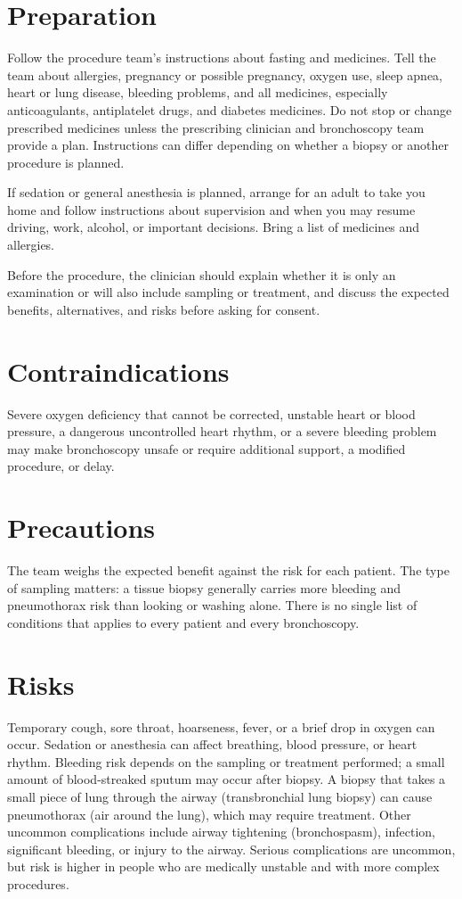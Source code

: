 \section*{Preparation}
Follow the procedure team's instructions about fasting and medicines. Tell the team about allergies, pregnancy or possible pregnancy, oxygen use, sleep apnea, heart or lung disease, bleeding problems, and all medicines, especially anticoagulants, antiplatelet drugs, and diabetes medicines. Do not stop or change prescribed medicines unless the prescribing clinician and bronchoscopy team provide a plan. Instructions can differ depending on whether a biopsy or another procedure is planned.

If sedation or general anesthesia is planned, arrange for an adult to take you home and follow instructions about supervision and when you may resume driving, work, alcohol, or important decisions. Bring a list of medicines and allergies.

Before the procedure, the clinician should explain whether it is only an examination or will also include sampling or treatment, and discuss the expected benefits, alternatives, and risks before asking for consent.

\section*{Contraindications}
Severe oxygen deficiency that cannot be corrected, unstable heart or blood pressure, a dangerous uncontrolled heart rhythm, or a severe bleeding problem may make bronchoscopy unsafe or require additional support, a modified procedure, or delay.

\section*{Precautions}
The team weighs the expected benefit against the risk for each patient. The type of sampling matters: a tissue biopsy generally carries more bleeding and pneumothorax risk than looking or washing alone. There is no single list of conditions that applies to every patient and every bronchoscopy.

\section*{Risks}
Temporary cough, sore throat, hoarseness, fever, or a brief drop in oxygen can occur. Sedation or anesthesia can affect breathing, blood pressure, or heart rhythm. Bleeding risk depends on the sampling or treatment performed; a small amount of blood-streaked sputum may occur after biopsy. A biopsy that takes a small piece of lung through the airway (transbronchial lung biopsy) can cause pneumothorax (air around the lung), which may require treatment. Other uncommon complications include airway tightening (bronchospasm), infection, significant bleeding, or injury to the airway. Serious complications are uncommon, but risk is higher in people who are medically unstable and with more complex procedures.

